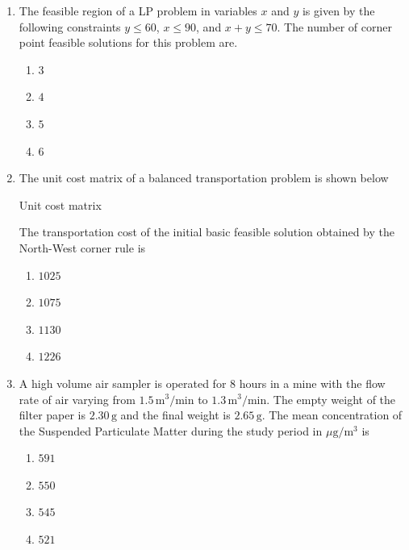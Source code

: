 \documentclass[journal,12pt,onecolumn]{IEEEtran}
\theoremstyle{remark}
\begin{document}
\begin{enumerate}
\item The feasible region of a LP problem in variables $x$ and $y$ is given by the following constraints  
$y \leq 60$, $x \leq 90$, and $x + y \leq 70$.
The number of corner point feasible solutions for this problem are.
\

\hfill{}

\begin{multicols}{4}
\begin{enumerate}
\item $3$
\item $4$
\item $5$
\item $6$
\end{enumerate}
\end{multicols}

\item The unit cost matrix of a balanced transportation problem is shown below
\begin{table}[H]
  \centering
  \caption{Unit cost matrix}
  
  \label{tab:table2}
\end{table}
The transportation cost of the initial basic feasible solution obtained by the North-West corner rule is 

\hfill{}
\begin{multicols}{4}
\begin{enumerate}
\item $1025$
\item $1075$
\item $1130$
\item $1226$
\end{enumerate}
\end{multicols}

\item A high volume air sampler is operated for 8 hours in a mine with the flow rate of air varying from 
$1.5\, \mathrm{m}^3/\mathrm{min}$ to $1.3\, \mathrm{m}^3/\mathrm{min}$. The empty weight of the filter paper is 
$2.30\, \mathrm{g}$ and the final weight is $2.65\, \mathrm{g}$. The mean concentration of the Suspended 
Particulate Matter  during the study period in $\mu\mathrm{g}/\mathrm{m}^3$ is

\hfill{}
\begin{multicols}{4}
\begin{enumerate}
\item $591$
\item $550$
\item $545$
\item $ 521$
\end{enumerate}
\end{multicols}


\end{enumerate}
\end{document}

